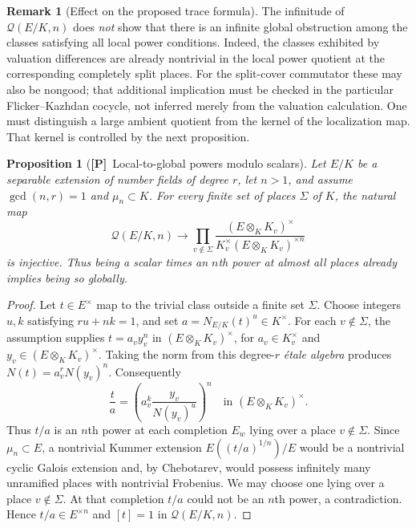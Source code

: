 \documentclass[11pt]{article}
\newcommand{\Ptag}{\textnormal{\textbf{[P]}}}
\theoremstyle{plain}
\newtheorem{proposition}[theorem]{Proposition}
\theoremstyle{definition}
\newtheorem{remark}[theorem]{Remark}
\begin{document}
\begin{remark}[Effect on the proposed trace formula]
The infinitude of $\mathcal Q(E/K,n)$ does \emph{not} show that
there is an infinite global obstruction among the classes satisfying
all local power conditions. Indeed, the classes exhibited by valuation
differences are already nontrivial in the local power quotient at
the corresponding completely split places. For the split-cover
commutator these may also be nongood; that additional implication
must be checked in the particular Flicker--Kazhdan cocycle, not
inferred merely from the valuation calculation. One must distinguish
a large ambient quotient from the kernel of the localization map.
That kernel is controlled by the next proposition.
\end{remark}


\begin{proposition}[\Ptag\ Local-to-global powers modulo scalars]\label{prop:global-power-hasse}
Let $E/K$ be a separable extension of number fields of degree $r$,
let $n>1$, and assume $\gcd(n,r)=1$ and $\mu_n\subset K$.
For \emph{every finite set of places} $\Sigma$ of $K$, the natural map
\begin{equation}\label{eq:power-local-inj}
 \mathcal Q(E/K,n)\longrightarrow
 \prod_{v\notin\Sigma}\frac{(E\otimes_K K_v)^\times}
 {K_v^\times (E\otimes_K K_v)^{\times n}}
\end{equation}
is injective. Thus being a scalar times an $n$th power at
\emph{almost all places} already implies being so globally.
\end{proposition}
\begin{proof}
Let $t\in E^\times$ map to the trivial class outside a finite set $\Sigma$.
Choose integers $u,k$ satisfying $ru+nk=1$, and set
$a=N_{E/K}(t)^u\in K^\times$.
For each $v\notin\Sigma$, the assumption supplies
$t=a_v y_v^n$ in $(E\otimes_K K_v)^\times$, for
$a_v\in K_v^\times$ and $y_v\in(E\otimes_K K_v)^\times$.
Taking the norm from this degree-$r$ \emph{\'{e}tale algebra}
produces $N(t)=a_v^r N(y_v)^n$. Consequently
\[
\frac{t}{a}=
\left(a_v^k\frac{y_v}{N(y_v)^u}\right)^n
\quad\text{in }(E\otimes_K K_v)^\times.
\]
Thus $t/a$ is an $n$th power at each completion $E_w$ lying over a place $v\notin\Sigma$.
Since $\mu_n\subset E$, a nontrivial Kummer extension
$E((t/a)^{1/n})/E$ would be a nontrivial cyclic Galois
extension and, by Chebotarev, would possess infinitely many unramified
places with nontrivial Frobenius. We may choose one lying over
a place $v\notin\Sigma$. At that completion $t/a$ could not
be an $n$th power, a contradiction. Hence
$t/a\in E^{\times n}$ and $[t]=1$ in $\mathcal Q(E/K,n)$.
\end{proof}
\end{document}
